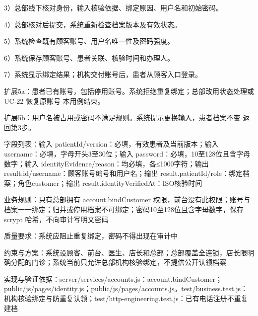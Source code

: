 \documentclass[UTF8,12pt,a4paper,fontset=none]{ctexart}
\begin{document}
3）总部线下核对身份，输入核验依据、绑定原因、用户名和初始密码。\par
4）总部核对后提交，系统重新检查档案版本及有效状态。\par
5）系统检查既有顾客账号、用户名唯一性及密码强度。\par
6）系统保存顾客账号、患者关联、核验时间和办理人。\par
7）系统显示绑定结果；机构交付账号后，患者从顾客入口登录。\par
扩展5a：患者已有账号，包括停用账号。系统拒绝重复绑定；总部改用状态处理或 UC-22 恢复原账号 本用例结束。\par
扩展5b：用户名被占用或密码不满足规则。系统提示更换输入，患者档案不变 返回第3步。\par
字段列表：输入 patientId/\allowbreak{}version：必填，有效患者及当前版本；输入 username：必填，字母开头3至30位；输入 password：必填，10至128位且含字母数字；输入 identityEvidence/\allowbreak{}reason：均必填，各≤1000字符；输出 result.\allowbreak{}id/\allowbreak{}username：顾客账号编号和用户名；输出 result.\allowbreak{}patientId/\allowbreak{}role：绑定档案；角色customer；输出 result.\allowbreak{}identityVerifiedAt：ISO核验时间\par
业务规则：只有总部拥有 account.\allowbreak{}bindCustomer 权限，前台没有此权限；账号与档案一一绑定；归并或停用档案不可绑定；密码10至128位且含字母数字，保存 scrypt 哈希，不向审计写明文密码\par
质量要求：系统应阻止重复绑定，密码不得出现在审计中\par
约束与方案：系统设顾客、前台、医生、店长和总部；总部覆盖全连锁，店长限明确分配的门诊；系统当前只允许总部机构核验绑定，不提供公开认领档案\par
实现与验证依据：server/\allowbreak{}services/\allowbreak{}accounts.\allowbreak{}js：account.\allowbreak{}bindCustomer；public/\allowbreak{}js/\allowbreak{}pages/\allowbreak{}identity.\allowbreak{}js；public/\allowbreak{}js/\allowbreak{}pages/\allowbreak{}accounts.\allowbreak{}js。test/\allowbreak{}business.\allowbreak{}test.\allowbreak{}js：机构核验绑定与防重复认领；test/\allowbreak{}http-engineering.\allowbreak{}test.\allowbreak{}js：已有电话注册不重复建档\par
{}
\end{document}
